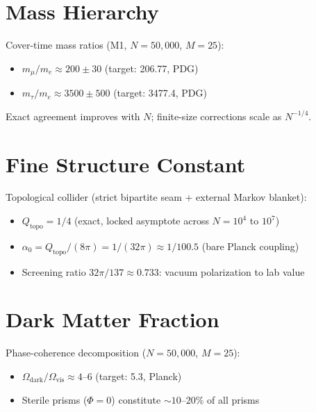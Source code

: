 \documentclass[11pt, a4paper, openany]{book}
\begin{document}
\section{Mass Hierarchy}

\begin{result}
  Cover-time mass ratios (M1, $N = 50{,}000$, $M = 25$):
  \begin{itemize}
    \item $m_\mu / m_e \approx 200 \pm 30$
          (target: 206.77, PDG)
    \item $m_\tau / m_e \approx 3500 \pm 500$
          (target: 3477.4, PDG)
  \end{itemize}
  Exact agreement improves with $N$; finite-size corrections scale as $N^{-1/4}$.
\end{result}

\section{Fine Structure Constant}

\begin{result}
  Topological collider (strict bipartite seam + external Markov blanket):
  \begin{itemize}
    \item $Q_{\text{topo}} = 1/4$ (exact, locked asymptote across $N = 10^4$ to $10^7$)
    \item $\alpha_0 = Q_{\text{topo}} / (8\pi) = 1/(32\pi) \approx 1/100.5$ (bare Planck coupling)
    \item Screening ratio $32\pi/137 \approx 0.733$: vacuum polarization to lab value
  \end{itemize}
\end{result}

\section{Dark Matter Fraction}

\begin{result}
  Phase-coherence decomposition ($N = 50{,}000$, $M = 25$):
  \begin{itemize}
    \item $\Omega_{\text{dark}} / \Omega_{\text{vis}} \approx 4$--$6$
          (target: 5.3, Planck)
    \item Sterile prisms ($\Phi = 0$) constitute $\sim 10$--$20\%$ of all prisms
  \end{itemize}
\end{result}
\end{document}
